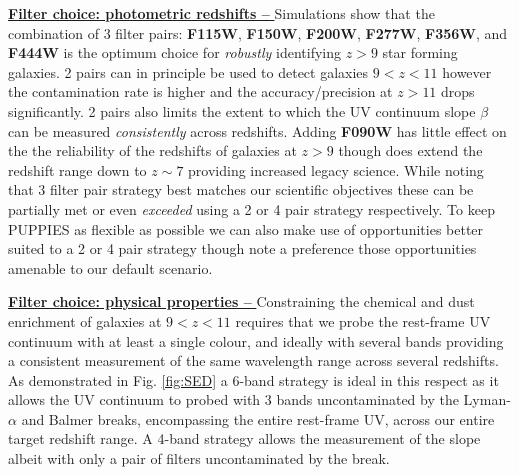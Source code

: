 \documentclass[12pt]{article}
\begin{document}
\noindent
\underline{\bf Filter choice: photometric redshifts -- } Simulations show that the combination of 3 filter pairs: {\bf F115W}, {\bf F150W}, {\bf F200W}, {\bf F277W}, {\bf F356W}, and {\bf F444W} is the optimum choice for \emph{robustly} identifying $z>9$ star forming galaxies. 2 pairs can in principle be used to detect galaxies $9<z<11$ however the contamination rate is higher and the accuracy/precision at $z>11$ drops significantly. 2 pairs also limits the extent to which the UV continuum slope $\beta$ can be measured \emph{consistently} across redshifts. Adding {\bf F090W} has little effect on the the reliability of the redshifts of galaxies at $z>9$ though does extend the redshift range down to $z\sim 7$ providing increased legacy science. While noting that 3 filter pair strategy best matches our scientific objectives these can be partially met or even \emph{exceeded} using a 2 or 4 pair strategy respectively. To keep PUPPIES as flexible as possible we can also make use of opportunities better suited to a 2 or 4 pair strategy though note a preference those opportunities amenable to our default scenario.

\noindent
\underline{\bf Filter choice: physical properties -- } Constraining the chemical and dust enrichment of galaxies at $9<z<11$ requires that we probe the rest-frame UV continuum with at least a single colour, and ideally with several bands providing a consistent measurement of the same wavelength range across several redshifts. As demonstrated in Fig. \ref{fig:SED} a 6-band strategy is ideal in this respect as it allows the UV continuum to probed with 3 bands uncontaminated by the Lyman-$\alpha$ and Balmer breaks, encompassing the entire rest-frame UV, across our entire target redshift range. A 4-band strategy allows the measurement of the slope albeit with only a pair of filters uncontaminated by the break.
\end{document}

